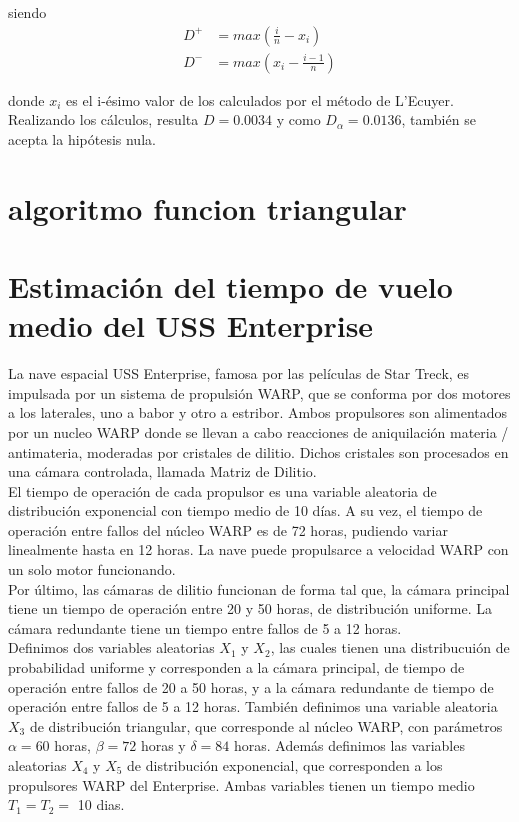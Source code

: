 \documentclass[10pt,journal,compsoc]{IEEEtran}
\begin{document}
siendo
\begin{align}
 D^{+} &= max(\frac{i}{n}-x_i)\\
 D^{-} &= max(x_i - \frac{i-1}{n})
\end{align}

donde $x_i$ es el i-\'esimo valor de los calculados por el m\'etodo de L'Ecuyer.
Realizando los c\'alculos, resulta $D = 0.0034$ y como $D_{\alpha} = 0.0136$,
tambi\'en se acepta la hip\'otesis nula.

\section{}

\section{algoritmo funcion triangular}

\section{Estimaci\'on del tiempo de vuelo medio del USS Enterprise}
La nave espacial USS Enterprise, famosa por las pel\'iculas de Star Treck, es impulsada por un sistema de propulsi\'on WARP, 
que se conforma por dos motores a los laterales, uno a babor y otro a estribor. Ambos propulsores son alimentados por un nucleo WARP
donde se llevan a cabo reacciones de aniquilaci\'on materia / antimateria, moderadas por cristales de dilitio. Dichos cristales 
son procesados en una c\'amara controlada, llamada Matriz de Dilitio.\\
El tiempo de operaci\'on de cada propulsor es una variable aleatoria de distribuci\'on exponencial con tiempo medio de 10 d\'ias. 
A su vez, el tiempo de operaci\'on entre fallos del n\'ucleo WARP es de 72 horas, pudiendo variar linealmente hasta en 12 horas. 
La nave puede propulsarce a velocidad WARP con un solo motor funcionando.\\
Por \'ultimo, las c\'amaras de dilitio funcionan de forma tal que, la c\'amara principal tiene un tiempo de operaci\'on entre 
20 y 50 horas, de distribuci\'on uniforme. La c\'amara redundante tiene un tiempo entre fallos de 5 a 12 horas.\\
\indent Definimos dos variables aleatorias  $X_1$ y $X_2$, las cuales tienen una distribucui\'on de probabilidad uniforme y corresponden 
a la c\'amara principal, de tiempo de operaci\'on entre fallos de 20 a 50 horas, y a la c\'amara redundante de tiempo de 
operaci\'on entre fallos de 5 a 12 horas. Tambi\'en definimos una variable aleatoria $X_3$ de distribuci\'on 
triangular, que corresponde al n\'ucleo WARP, con par\'ametros $\alpha = 60$ horas, $\beta = 72$ horas y $\delta = 84$ horas. Adem\'as
definimos las variables aleatorias $X_4$ y $X_5$ de distribuci\'on exponencial, que corresponden a los propulsores WARP del Enterprise.
Ambas variables tienen un tiempo medio $T_1 = T_2 = $ 10 dias.\\
\end{document}
